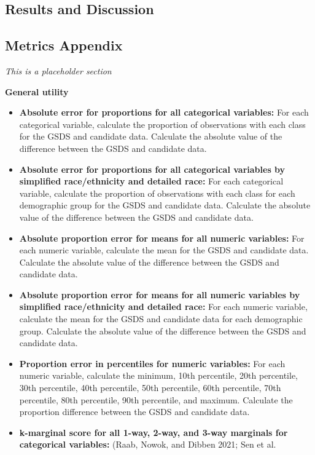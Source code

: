 \documentclass[
]{urban-formatting}
\begin{document}
\subsection{Results and Discussion}

\subsection{Metrics Appendix}

\emph{This is a placeholder section}

\textbf{General utility}

\begin{itemize}
\item
  \textbf{Absolute error for proportions for all categorical variables:}
  For each categorical variable, calculate the proportion of
  observations with each class for the GSDS and candidate data.
  Calculate the absolute value of the difference between the GSDS and
  candidate data.
\item
  \textbf{Absolute error for proportions for all categorical variables
  by simplified race/ethnicity and detailed race:} For each categorical
  variable, calculate the proportion of observations with each class for
  each demographic group for the GSDS and candidate data. Calculate the
  absolute value of the difference between the GSDS and candidate data.
\item
  \textbf{Absolute proportion error for means for all numeric
  variables:} For each numeric variable, calculate the mean for the GSDS
  and candidate data. Calculate the absolute value of the difference
  between the GSDS and candidate data.
\item
  \textbf{Absolute proportion error for means for all numeric variables
  by simplified race/ethnicity and detailed race:} For each numeric
  variable, calculate the mean for the GSDS and candidate data for each
  demographic group. Calculate the absolute value of the difference
  between the GSDS and candidate data.
\item
  \textbf{Proportion error in percentiles for numeric variables:} For
  each numeric variable, calculate the minimum, 10th percentile, 20th
  percentile, 30th percentile, 40th percentile, 50th percentile, 60th
  percentile, 70th percentile, 80th percentile, 90th percentile, and
  maximum. Calculate the proportion difference between the GSDS and
  candidate data.
\item
  \textbf{k-marginal score for all 1-way, 2-way, and 3-way marginals for
  categorical variables:} (Raab, Nowok, and Dibben 2021; Sen et al.

\end{itemize}
\end{document}
